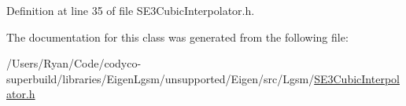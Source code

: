 Definition at line 35 of file S\+E3\+Cubic\+Interpolator.\+h.



The documentation for this class was generated from the following file\+:\begin{DoxyCompactItemize}
\item 
/\+Users/\+Ryan/\+Code/codyco-\/superbuild/libraries/\+Eigen\+Lgsm/unsupported/\+Eigen/src/\+Lgsm/\hyperlink{_s_e3_cubic_interpolator_8h}{S\+E3\+Cubic\+Interpolator.\+h}\end{DoxyCompactItemize}
